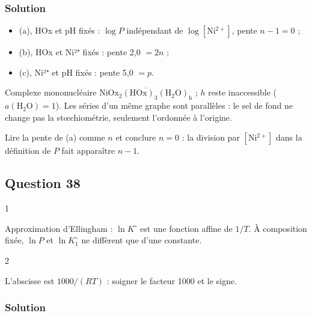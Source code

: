 \documentclass[11pt,a4paper]{article}
\providecommand{\tightlist}{\setlength{\itemsep}{0pt}\setlength{\parskip}{0pt}}
\newcommand{\equationajustee}[1]{%
  \sbox{\boiteequation}{$\displaystyle #1$}%
  \ifdim\wd\boiteequation>\linewidth
    \[\resizebox{\linewidth}{!}{\usebox{\boiteequation}}\]%
  \else
    \[#1\]%
  \fi}
\begin{document}
\hypertarget{solution-36}{%
\subsubsection{Solution}\label{solution-36}}

\begin{itemize}
\tightlist
\item
  (a), HOx et pH fixés : \(\log P\) indépendant de \(\log[\mathrm{Ni^{2+}}]\), pente \(n-1=0\) ;
\item
  (b), HOx et Ni²⁺ fixés : pente 2,0 \(=2n\) ;
\item
  (c), Ni²⁺ et pH fixés : pente 5,0 \(=p\).
\end{itemize}

\equationajustee{\boxed{n=1}}

\equationajustee{\boxed{p=5}}

Complexe mononucléaire \(\overline{\mathrm{NiOx_2(HOx)_3(H_2O)_h}}\) ; \(h\) reste inaccessible (\(a(\mathrm{H_2O})=1\)). Les séries d'un même graphe sont parallèles : le sel de fond ne change pas la stœchiométrie, seulement l'ordonnée à l'origine.

\begin{piege}

Lire la pente de (a) comme \(n\) et conclure \(n=0\) : la division par \([\mathrm{Ni^{2+}}]\) dans la définition de \(P\) fait apparaître \(n-1\).

\end{piege}

\hypertarget{question-38}{%
\subsection{Question 38}\label{question-38}}

\begin{indication}{1}

Approximation d'Ellingham : \(\ln K^\circ\) est une fonction affine de \(1/T\). À composition fixée, \(\ln P\) et \(\ln K_1^\circ\) ne diffèrent que d'une constante.

\end{indication}

\begin{indication}{2}

L'abscisse est \(1000/(RT)\) : soigner le facteur 1000 et le signe.

\end{indication}

\hypertarget{solution-37}{%
\subsubsection{Solution}\label{solution-37}}
\end{document}
